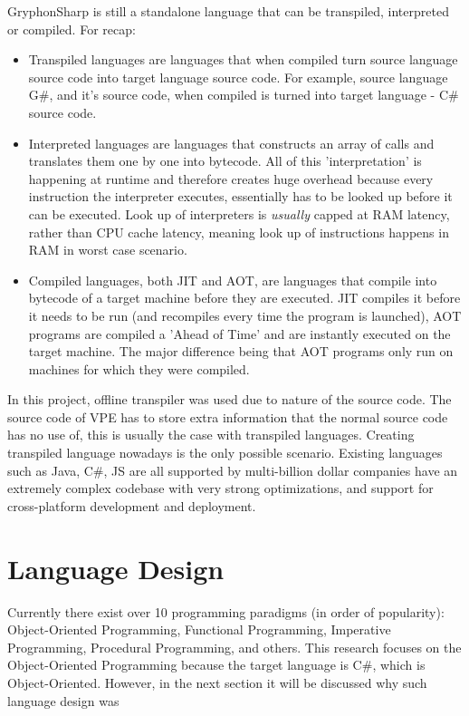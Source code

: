 \documentclass{article}
\begin{document}
GryphonSharp is still a standalone language that can be transpiled, interpreted or compiled. For recap:
\begin{itemize}
    \item Transpiled languages are languages that when compiled turn source language source code into target language source code. For example, source language G\#, and it's source code, when compiled is turned into target language - C\# source code.
    \item Interpreted languages are languages that constructs an array of calls and translates them one by one into bytecode. All of this 'interpretation' is happening at runtime and therefore creates huge overhead because every instruction the interpreter executes, essentially has to be looked up before it can be executed. Look up of interpreters is \textit{usually} capped at RAM latency, rather than CPU cache latency, meaning look up of instructions happens in RAM in worst case scenario. 
    \item Compiled languages, both JIT and AOT, are languages that compile into bytecode of a target machine before they are executed. JIT compiles it before it needs to be run (and recompiles every time the program is launched), AOT programs are compiled a 'Ahead of Time' and are instantly executed on the target machine. The major difference being that AOT programs only run on machines for which they were compiled.
\end{itemize}

In this project, offline transpiler was used due to nature of the source code. The source code of VPE has to store extra information that the normal source code has no use of, this is usually the case with transpiled languages. Creating transpiled language nowadays is the only possible scenario. Existing languages such as Java, C\#, JS are all supported by multi-billion dollar companies have an extremely complex codebase with very strong optimizations, and support for cross-platform development and deployment.



\section{Language Design}
\label{sec:landes}
Currently there exist over 10 programming paradigms (in order of popularity): Object-Oriented Programming, Functional Programming, Imperative Programming, Procedural Programming, and others.
This research focuses on the Object-Oriented Programming because the target language is C\#, which is Object-Oriented. However, in the next section it will be discussed why such language design was
\end{document}
